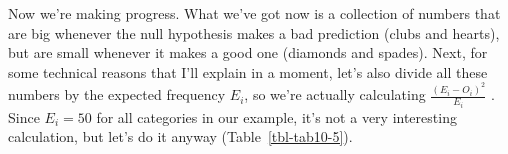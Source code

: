 \documentclass[
  a4paper,
]{book}
\begin{document}
Now we're making progress. What we've got now is a collection of numbers
that are big whenever the null hypothesis makes a bad prediction (clubs
and hearts), but are small whenever it makes a good one (diamonds and
spades). Next, for some technical reasons that I'll explain in a moment,
let's also divide all these numbers by the expected frequency \(E_i\),
so we're actually calculating \(\frac{(E_i-O_i)^2}{E_i}\) . Since
\(E_i = 50\) for all categories in our example, it's not a very
interesting calculation, but let's do it anyway
(Table~\ref{tbl-tab10-5}).

\hypertarget{tbl-tab10-5}{}
 
  \providecommand{\huxb}[2]{\arrayrulecolor[RGB]{#1}\global\arrayrulewidth=#2pt}
  \providecommand{\huxvb}[2]{\color[RGB]{#1}\vrule width #2pt}
  \providecommand{\huxtpad}[1]{\rule{0pt}{#1}}
  \providecommand{\huxbpad}[1]{\rule[-#1]{0pt}{#1}}
\end{document}
